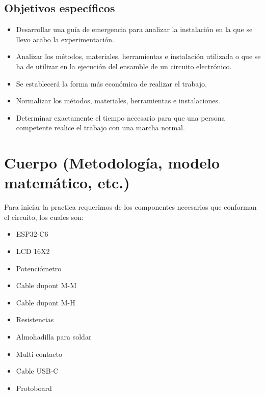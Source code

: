     \subsection{Objetivos específicos }
    \begin{itemize}
        \item Desarrollar una guía de emergencia para analizar la instalación en la que se llevo acabo la experimentación.
        \item Analizar los métodos, materiales, herramientas e instalación utilizada o que se ha de utilizar en la ejecución del ensamble de un circuito electrónico.
        \item Se establecerá la forma más económica de realizar el trabajo.
        \item Normalizar los métodos, materiales, herramientas e instalaciones.
        \item Determinar exactamente el tiempo necesario para que una persona competente realice el trabajo con una marcha normal.
    \end{itemize}
    
    \section{Cuerpo (Metodología, modelo matemático, etc.)}
    Para iniciar la practica requerimos de los componentes necesarios que conforman el circuito, los cuales son:
    \begin{itemize}
        \item ESP32-C6
        \item LCD 16X2
        \item Potenciómetro
        \item Cable dupont M-M
        \item Cable dupont M-H
        \item Resistencias
        \item Almohadilla para soldar
        \item Multi contacto
        \item Cable USB-C
        \item Protoboard 
    \end{itemize}
    
